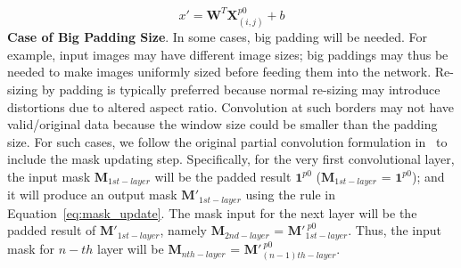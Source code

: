 \documentclass[10pt,twocolumn,letterpaper]{article}
\begin{document}
\begin{equation}
\label{eq:convzeropadding}
x'=\mathbf{W}^T\mathbf{X}^{p0}_{(i,j)}+b
\end{equation}\textbf{Case of Big Padding Size}. 
 In some cases, big padding will be needed. For example, input images may have different image sizes; big paddings may thus be needed to make images uniformly sized before feeding them into the network. Re-sizing by padding is typically preferred because normal re-sizing may introduce distortions due to altered aspect ratio. Convolution at such borders may not have valid/original data because the window size could be smaller than the padding size. 
For such cases, we follow the original partial convolution formulation in~\cite{liu2018image} to include the mask updating step. Specifically, for the very first convolutional layer, the input mask $\mathbf{M}_{1st-layer}$ will be the padded result $\mathbf{1}^{p0}$ ($\mathbf{M}_{1st-layer}$ = $\mathbf{1}^{p0}$); and it will produce an output mask $\mathbf{M}'_{1st-layer}$ using the rule in Equation~\ref{eq:mask_update}. The mask input for the next layer will be the padded result of $\mathbf{M}'_{1st-layer}$, namely $\mathbf{M}_{2nd-layer}$ = $\mathbf{M}'^{\ p0}_{1st-layer}$. Thus, the input mask for $n-th$ layer will be $\mathbf{M}_{nth-layer}$ = $\mathbf{M}'^{\ p0}_{(n-1)th-layer}$.
\end{document}
